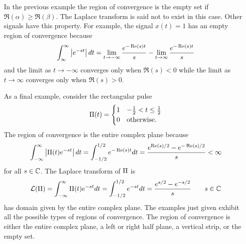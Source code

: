 In the previous example the region of convergence is the empty set if $\Re(\alpha) \geq \Re(\beta)$.  The Laplace transform is said not to exist in this case.  Other signals have this property.  For example, the signal $x(t) = 1$ has an empty region of convergence because
\[
\int_{\infty}^\infty \left\vert e^{-s t} \right\vert dt = \lim_{t\to -\infty} \frac{e^{-\operatorname{Re}(s)t}}{s} -  \lim_{t\to \infty} \frac{e^{-\operatorname{Re}(s)t}}{s}
\] 
and the limit as $t\to-\infty$ converges only when $\Re(s) < 0$ while the limit as $t \to \infty$ converges only when $\Re(s) > 0$.  %

As a final example, consider the rectangular pulse
\[
\Pi(t) = \begin{cases}
1 & -\tfrac{1}{2} < t \leq \tfrac{1}{2} \\
0 & \text{otherwise}.
\end{cases}
\]
The region of convergence is the entire complex plane because
\[
\int_{-\infty}^{\infty} \left\vert \Pi(t) e^{-st} \right\vert dt = \int_{-1/2}^{1/2} e^{-\operatorname{Re}(s)t} dt = \frac{ e^{\operatorname{Re}(s)/2} - e^{-\operatorname{Re}(s)/2}}{s} < \infty
\]
for all $s \in {\mathbb C}$.  The Laplace transform of $\Pi$ is
\begin{equation}\label{eq:rectLaplace}
\mathcal L(\Pi) = \int_{-\infty}^{\infty} \Pi(t) e^{-st} dt = \int_{-1/2}^{1/2} e^{-st} dt = \frac{ e^{s/2} - e^{-s/2}}{s} \qquad s \in {\mathbb C}
\end{equation}
has domain given by the entire complex plane.  The examples just given exhibit all the possible types of regions of convergence.  The region of convergence is either the entire complex plane, a left or right half plane, a vertical strip, or the empty set.
 

